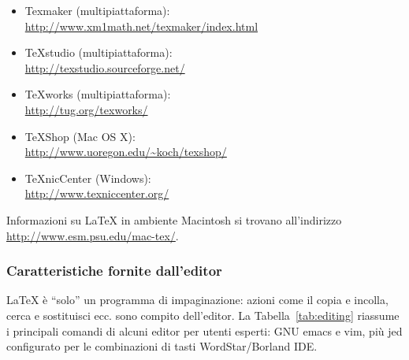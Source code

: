 \documentclass[a4paper,11pt]{article}
\newcommand{\app}[1]
{\textsf{#1}}
\begin{document}
\begin{itemize}

  \item Texmaker (multipiattaforma):\\
  \url{http://www.xm1math.net/texmaker/index.html}

 \item TeXstudio (multipiattaforma):\\
  \url{http://texstudio.sourceforge.net/}

  \item TeXworks (multipiattaforma):\\
  \url{http://tug.org/texworks/}
  
  
  \item TeXShop (Mac OS X):\\
  \url{http://www.uoregon.edu/~koch/texshop/}
  
  \item TeXnicCenter (Windows):\\
  \url{http://www.texniccenter.org/}
    
\end{itemize}

Informazioni su \LaTeX{} in ambiente Macintosh si trovano
all'indirizzo \url{http://www.esm.psu.edu/mac-tex/}.



\subsubsection{Caratteristiche fornite dall'editor}

\LaTeX{} \`e ``solo'' un programma di impaginazione: azioni come il
copia e incolla, cerca e sostituisci ecc. sono compito dell'editor.
La Tabella~\ref{tab:editing} riassume i principali comandi di alcuni
editor per utenti esperti: GNU \app{emacs} e \app{vim}, pi\`u 
\app{jed} configurato per le combinazioni di tasti WordStar/Borland
IDE.
\end{document}
